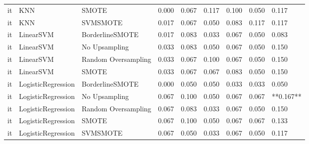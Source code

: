 \begin{tabular}{lllllllll}
      it &                          KNN &               SMOTE & 0.000 &                     0.067 &                 0.117 &                  0.100 &                                   0.050 &     0.117 \\
      it &                          KNN &            SVMSMOTE & 0.017 &                     0.067 &                 0.050 &                  0.083 &                                   0.117 &     0.117 \\
      it &                    LinearSVM &     BorderlineSMOTE & 0.017 &                     0.083 &                 0.033 &                  0.067 &                                   0.050 &     0.083 \\
      it &                    LinearSVM &       No Upsampling & 0.033 &                     0.083 &                 0.050 &                  0.067 &                                   0.050 &     0.150 \\
      it &                    LinearSVM & Random Oversampling & 0.033 &                     0.067 &                 0.100 &                  0.067 &                                   0.050 &     0.150 \\
      it &                    LinearSVM &               SMOTE & 0.033 &                     0.067 &                 0.067 &                  0.083 &                                   0.050 &     0.150 \\
      it &           LogisticRegression &     BorderlineSMOTE & 0.000 &                     0.050 &                 0.050 &                  0.033 &                                   0.033 &     0.050 \\
      it &           LogisticRegression &       No Upsampling & 0.067 &                     0.100 &                 0.050 &                  0.067 &                                   0.067 & **0.167** \\
      it &           LogisticRegression & Random Oversampling & 0.067 &                     0.083 &                 0.033 &                  0.067 &                                   0.050 &     0.150 \\
      it &           LogisticRegression &               SMOTE & 0.067 &                     0.100 &                 0.050 &                  0.067 &                                   0.067 &     0.133 \\
      it &           LogisticRegression &            SVMSMOTE & 0.067 &                     0.050 &                 0.033 &                  0.067 &                                   0.050 &     0.117 \\

\end{tabular}
